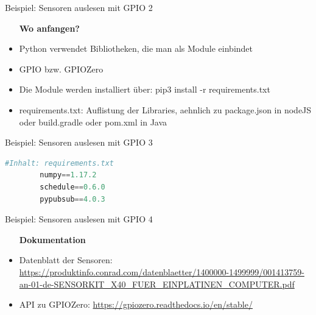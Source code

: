 \begin{frame}{Beispiel: Sensoren auslesen mit GPIO 2}
    \begin{itemize}
    \setlength{\itemindent}{1in}
     \item [\textbf{ Wo anfangen?}]
    \end{itemize}
    \begin{itemize}
        \item  Python verwendet Bibliotheken, die man als Module einbindet
        \item  GPIO bzw. GPIOZero
        \item  Die Module werden installiert über:  pip3 install -r requirements.txt
        \item  requirements.txt: Auflistung der Libraries, aehnlich zu package.json in nodeJS oder build.gradle oder pom.xml in Java
     \end{itemize}
\end{frame}

\begin{frame}[fragile]{Beispiel: Sensoren auslesen mit GPIO 3}
    \begin{lstlisting}[language=Python, gobble=8]
        #Inhalt: requirements.txt
        numpy==1.17.2
        schedule==0.6.0
        pypubsub==4.0.3
    \end{lstlisting}
\end{frame}

\begin{frame}{Beispiel: Sensoren auslesen mit GPIO 4}
    \begin{itemize}
    \setlength{\itemindent}{1.0in}
     \item [\textbf{ Dokumentation}]
    \end{itemize}

    \begin{itemize}
        \item Datenblatt der Sensoren: \url{https://produktinfo.conrad.com/datenblaetter/1400000-1499999/001413759-an-01-de-SENSORKIT_X40_FUER_EINPLATINEN_COMPUTER.pdf}
        \item API zu GPIOZero: \url{https://gpiozero.readthedocs.io/en/stable/}
     \end{itemize}
\end{frame}

